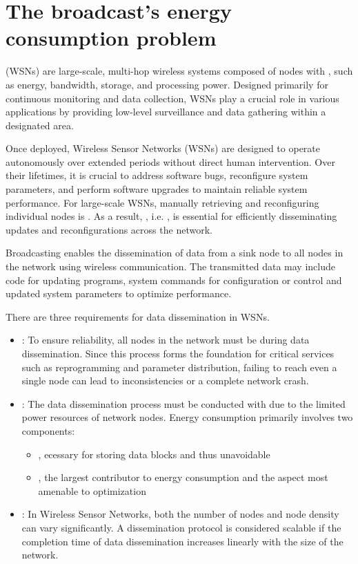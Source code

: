 \documentclass[a4paper, 12pt]{report}
\begin{document}
    \chapter{The broadcast's energy consumption problem}

     (WSNs) are large-scale, multi-hop wireless systems composed of nodes with , such as energy, bandwidth, storage, and processing power. Designed primarily for continuous monitoring and data collection, WSNs play a crucial role in various applications by providing low-level surveillance and data gathering within a designated area.

    Once deployed, Wireless Sensor Networks (WSNs) are designed to operate autonomously over extended periods without direct human intervention. Over their lifetimes, it is crucial to address software bugs, reconfigure system parameters, and perform software upgrades to maintain reliable system performance. For large-scale WSNs, manually retrieving and reconfiguring individual nodes is . As a result, , i.e. , is essential for efficiently disseminating updates and reconfigurations across the network.

    Broadcasting enables the dissemination of data from a sink node to all nodes in the network using wireless communication. The transmitted data may include code for updating programs, system commands for configuration or control and updated system parameters to optimize performance.

    There are three requirements for data dissemination in WSNs.

    \begin{itemize}
        \item {}: To ensure reliability, all nodes in the network must be  during data dissemination. Since this process forms the foundation for critical services such as reprogramming and parameter distribution, failing to reach even a single node can lead to inconsistencies or a complete network crash.
        \item {}: The data dissemination process must be conducted with  due to the limited power resources of network nodes. Energy consumption primarily involves two components:
            \begin{itemize}
                \item {}, ecessary for storing data blocks and thus unavoidable
                \item {}, the largest contributor to energy consumption and the aspect most amenable to optimization
            \end{itemize}
        \item {}: In Wireless Sensor Networks, both the number of nodes and node density can vary significantly. A dissemination protocol is considered scalable if the completion time of data dissemination increases linearly with the size of the network.
    \end{itemize}
\end{document}
